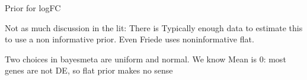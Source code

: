 \begin{outline}

Prior for logFC

\1 Not as much discussion in the lit:
\1 There is Typically enough data to estimate this to use a non informative prior.
\1 Even Friede uses noninformative flat.

\1 Two choices in bayesmeta are uniform and normal.
    \2 We know Mean is 0: most genes are not DE, so flat prior makes no sense



\end{outline}
